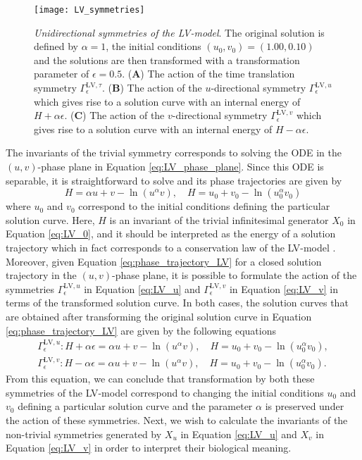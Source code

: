\begin{figure}[htbp!]
  \begin{center}
\texttt{[image: LV\_symmetries]}
\caption{\textit{Unidirectional symmetries of the LV-model}. The original solution is defined by $\alpha=1$, the initial conditions $(u_0,v_0)=(1.00,0.10)$ and the solutions are then transformed with a transformation parameter of $\epsilon=0.5$. (\textbf{A}) The action of the time translation symmetry $\Gamma^{\mathrm{LV},\tau}_{\epsilon}$. (\textbf{B}) The action of the $u$-directional symmetry $\Gamma^{\mathrm{LV},u}_{\epsilon}$ which gives rise to a solution curve with an internal energy of $H+\alpha\epsilon$. (\textbf{C}) The action of the $v$-directional symmetry $\Gamma^{\mathrm{LV},v}_{\epsilon}$ which gives rise to a solution curve with an internal energy of $H-\alpha\epsilon$.}
\label{fig:LV_symmetries}
\end{center}
\end{figure}

The invariants of the trivial symmetry corresponds to solving the ODE in the $(u,v)$-phase plane in Equation \eqref{eq:LV_phase_plane}. Since this ODE is separable, it is straightforward to solve and its phase trajectories are given by \cite{murray2002}
\begin{equation}
  H=\alpha u+v-\ln\left(u^\alpha v\right),\quad H=u_0+v_0-\ln\left(u_0^\alpha v_0\right)
  \label{eq:phase_trajectory_LV}
\end{equation}
where $u_0$ and $v_0$ correspond to the initial conditions defining the particular solution curve. Here, $H$ is an invariant of the trivial infinitesimal generator $X_0$ in Equation \eqref{eq:LV_0}, and it should be interpreted as the energy of a solution trajectory which in fact corresponds to a conservation law of the LV-model \cite{murray2002}. Moreover, given Equation \eqref{eq:phase_trajectory_LV} for a closed solution trajectory in the $(u,v)$-phase plane, it is possible to formulate the action of the symmetries $\Gamma^{\mathrm{LV},u}_\epsilon$ in Equation \eqref{eq:LV_u} and $\Gamma^{\mathrm{LV},v}_\epsilon$ in Equation \eqref{eq:LV_v} in terms of the transformed solution curve. In both cases, the solution curves that are obtained after transforming the original solution curve in Equation \eqref{eq:phase_trajectory_LV} are given by the following equations
\begin{align}
  \Gamma_{\epsilon}^{\mathrm{LV},u}:H+\alpha\epsilon=\alpha u+v-\ln\left(u^\alpha v\right),\quad H=u_0+v_0-\ln\left(u_0^\alpha v_0\right),\label{eq:trans_LV_u}\\
  \Gamma_{\epsilon}^{\mathrm{LV},v}:H-\alpha\epsilon=\alpha u+v-\ln\left(u^\alpha v\right),\quad H=u_0+v_0-\ln\left(u_0^\alpha v_0\right).\label{eq:trans_LV_v}
\end{align}
From this equation, we can conclude that transformation by both these symmetries of the LV-model correspond to changing the initial conditions $u_0$ and $v_0$ defining a particular solution curve and the parameter $\alpha$ is preserved under the action of these symmetries. Next, we wish to calculate the invariants of the non-trivial symmetries generated by $X_u$ in Equation \eqref{eq:LV_u} and $X_v$ in Equation \eqref{eq:LV_v} in order to interpret their biological meaning.

 